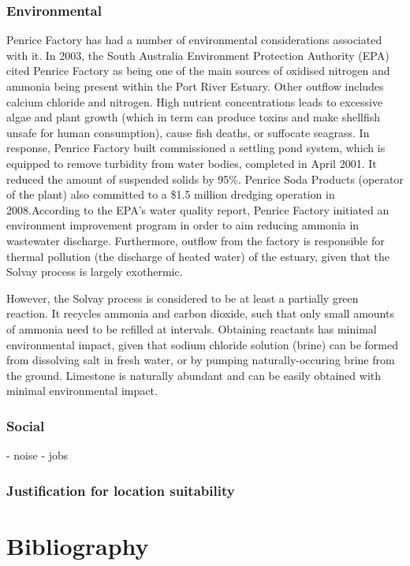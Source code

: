 \documentclass[12pt, a4paper]{article}
\begin{document}
\subsubsection{Environmental}

Penrice Factory has had a number of environmental considerations associated with it. In 2003, the South Australia Environment Protection Authority (EPA) cited Penrice Factory as being one of the main sources of oxidised nitrogen and ammonia being present within the Port River Estuary. Other outflow includes calcium chloride and nitrogen. High nutrient concentrations leads to excessive algae and plant growth (which in term can produce toxins and make shellfish unsafe for human consumption), cause fish deaths, or suffocate seagrass. In response, Penrice Factory built commissioned a settling pond system, which is equipped to remove turbidity from water bodies, completed in April 2001. It reduced the amount of suspended solids by 95\%. Penrice Soda Products (operator of the plant) also committed to a \$1.5 million dredging operation in 2008.According to the EPA's water quality report, Penrice Factory initiated an environment improvement program in order to aim reducing ammonia in wastewater discharge. Furthermore, outflow from the factory is responsible for thermal pollution (the discharge of heated water) of the estuary, given that the Solvay process is largely exothermic. 

However, the Solvay process is considered to be at least a partially green reaction. It recycles ammonia and carbon dioxide, such that only small amounts of ammonia need to be refilled at intervals. Obtaining reactants has minimal environmental impact, given that sodium chloride solution (brine) can be formed from dissolving salt in fresh water, or by pumping naturally-occuring brine from the ground. Limestone is naturally abundant and can be easily obtained with minimal environmental impact.

\subsubsection{Social}

- noise
- jobs

\subsubsection{Justification for location suitability}


\pagebreak

\section{Bibliography}
\end{document}
